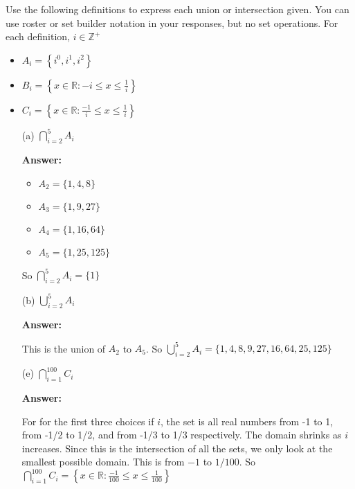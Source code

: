 \documentclass[14pt]{extreport}
\newcommand{\answer}[0]{\medskip \textbf{Answer:} \medskip}
\begin{document}
\begin{enumerate}
    Use the following definitions to express each union or intersection given. You can use roster or set builder notation in your responses, but no set operations. For each definition, \( i \in \mathbb{Z}^{+} \)

    \begin{itemize}
        \item \( A_i = \left\{ i^0, i^1, i^2 \right\} \)
        \item \( B_i = \left\{ x \in \mathbb{R}: -i \leq x \leq \frac{1}{i} \right\} \)
        \item \( C_i = \left\{ x \in \mathbb{R}: \frac{-1}{i} \leq x \leq \frac{1}{i} \right\} \)
    \end{itemize}
    
        \begin{enumerate}
            
            \item[(a)] \( \bigcap_{i=2}^{5} A_i \)
            
                \answer

                \begin{itemize}
                    \item \( A_2 = \{1, 4, 8\} \)
                    \item \( A_3 = \{1, 9, 27\} \)
                    \item \( A_4 = \{1, 16, 64\} \)
                    \item \( A_5 = \{1, 25, 125\} \)
                \end{itemize}

                So \( \bigcap_{i=2}^{5} A_i = \{1\} \)
            
            \item[(b)] \( \bigcup_{i=2}^5 A_i \)
            
                \answer

                This is the union of \( A_2 \) to \( A_5 \). So \( \bigcup_{i=2}^5 A_i = \{ 1, 4, 8, 9, 27, 16, 64, 25, 125 \} \)

            \item[(e)] \( \bigcap_{i=1}^{100} C_i \)
            
                \answer

                For for the first three choices if \( i \), the set is all real numbers from -1 to 1, from -1/2 to 1/2, and from -1/3 to 1/3 respectively. The domain shrinks as \( i \) increases. Since this is the intersection of all the sets, we only look at the smallest possible domain. This is from \( -1 \) to \( 1/100 \). So \( \bigcap_{i=1}^{100} C_i = \left\{ x \in \mathbb{R}: \frac{-1}{100} \leq x \leq \frac{1}{100} \right\} \)


\end{enumerate}
\end{enumerate}
\end{document}
